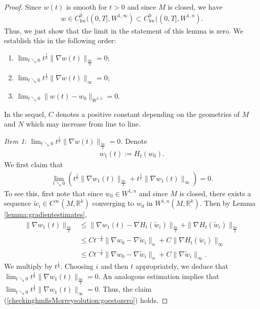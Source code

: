 \documentclass[12pt]{amsart}
\renewcommand{\1}{{\mathbf 1}}
\newcommand{\R}{{\mathbb R}}
\theoremstyle{others}
\numberwithin{equation}{section}
\begin{document}
\begin{proof}
   
   Since \(w(t)\) is smooth for \(t > 0\) and since \(M\) is closed, we have
   \begin{align*}
       w \in C_{\text{loc}}^0((0, T], W^{1, \infty}) \subset C_{\text{loc}}^0((0, T], W^{1, n}).
   \end{align*} Thus, we just show that the limit in the statement of this lemma is zero. We establish this in the following order:
   \begin{enumerate}
       \item \(\lim_{t \searrow 0} t^{\frac{1}{6}} \|\nabla w(t)\|_{\frac{3n}{2}} = 0\); 
       \item \(\lim_{t \searrow 0} t^{\frac{1}{2}} \|\nabla w(t)\|_\infty = 0\); 
       \item \(\lim_{t \searrow 0} \|w(t) - w_0\|_{W^{1, n}} = 0\).
   \end{enumerate}\par
   In the sequel, \(C\) denotes a positive constant depending on the geometries of \(M\) and \(N\) which may increase from line to line. \par
   \emph{Item 1: \(\lim_{t \searrow 0} t^{\frac{1}{6}} \|\nabla w(t)\|_{\frac{3n}{2}} = 0\).}
   Denote
   \begin{align*}
       w_1(t) := H_t(w_0).
   \end{align*} We first claim that
   \begin{align}\label{checkinghmfisMorreysolution:goestozero}
      \lim_{t \searrow 0} \left(t^{\frac{1}{6}} \|\nabla w_1(t)\|_{\frac{3n}{2}} + t^{\frac{1}{2}}\|\nabla w_1(t)\|_\infty\right) = 0. 
   \end{align} To see this, first note that since \(w_0 \in W^{1, n}\) and since \(M\) is closed, there exists a sequence \(\tilde{w}_i \in C^\infty(M, \R^k)\) converging to \(w_0\) in \(W^{1, n}(M, \R^k)\). Then by Lemma \ref{lemma:gradientestimates},
    \begin{align*}
        \|\nabla w_1(t)\|_{\frac{3n}{2}} &\leq \|\nabla w_1(t) - \nabla H_t(\tilde{w}_i)\|_{\frac{3n}{2}} + \|\nabla H_t(\tilde{w}_i)\|_{\frac{3n}{2}} \\
        &\leq C t^{-\frac{1}{6}}\|\nabla w_0 - \nabla \tilde{w}_i\|_n + C \|\nabla H_t(\tilde{w}_i)\|_\infty \\
        &\leq C t^{-\frac{1}{6}}\|\nabla w_0 - \nabla \tilde{w}_i\|_n + C \|\nabla \tilde{w}_i\|_\infty.
    \end{align*} We multiply by \(t^{\frac{1}{6}}\). Choosing \(i\) and then \(t\) appropriately, we deduce that \(\lim_{t \searrow 0} t^{\frac{1}{6}} \|\nabla w_1(t)\|_{\frac{3n}{2}} = 0\). An analogous estimation implies that \(\lim_{t \searrow 0} t^{\frac{1}{2}} \|\nabla w_1(t)\|_{\infty} = 0\). Thus, the claim (\ref{checkinghmfisMorreysolution:goestozero}) holds. \par

\end{proof}
\end{document}
